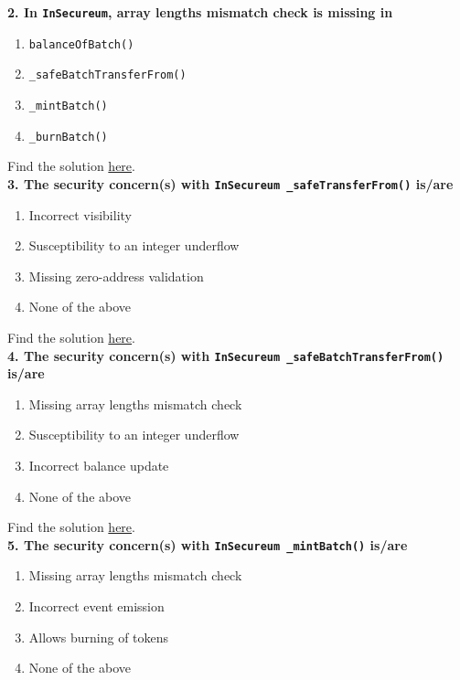 \textbf{2. In \texttt{InSecureum}, array lengths mismatch check is missing in}

\begin{enumerate}[label=\Alph*.]
    \item\verb|balanceOfBatch()|
    \item\verb|_safeBatchTransferFrom()|
    \item\verb|_mintBatch()|
    \item\verb|_burnBatch()|
\end{enumerate}

Find the solution \hyperref[sec:race5_q2]{here}.\\

\textbf{3. The security concern(s) with \texttt{InSecureum \_safeTransferFrom()} is/are}

\begin{enumerate}[label=\Alph*.]
    \item Incorrect visibility
    \item Susceptibility to an integer underflow
    \item Missing zero-address validation
    \item None of the above
\end{enumerate}

Find the solution \hyperref[sec:race5_q3]{here}.\\

\textbf{4. The security concern(s) with \texttt{InSecureum \_safeBatchTransferFrom()} is/are}

\begin{enumerate}[label=\Alph*.]
    \item Missing array lengths mismatch check
    \item Susceptibility to an integer underflow
    \item Incorrect balance update
    \item None of the above
\end{enumerate}

Find the solution \hyperref[sec:race5_q4]{here}.\\

\textbf{5. The security concern(s) with \texttt{InSecureum \_mintBatch()} is/are}

\begin{enumerate}[label=\Alph*.]
    \item Missing array lengths mismatch check
    \item Incorrect event emission
    \item Allows burning of tokens
    \item None of the above
\end{enumerate}

